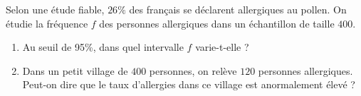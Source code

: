 
\begin{exercice}%
    \label{exosmath-0329}

    Selon une étude fiable, \( 26\%\) des français se déclarent allergiques au pollen. On étudie la fréquence $f$ des personnes allergiques dans un échantillon de taille $400$.
    \begin{enumerate}
        \item
 Au seuil de 95\%, dans quel intervalle $f$ varie-t-elle ?
 \item
    Dans un petit village de $400$ personnes, on relève $120$ personnes allergiques. Peut-on dire que le taux d’allergies dans ce village est anormalement élevé ?
    \end{enumerate}

\end{exercice}
